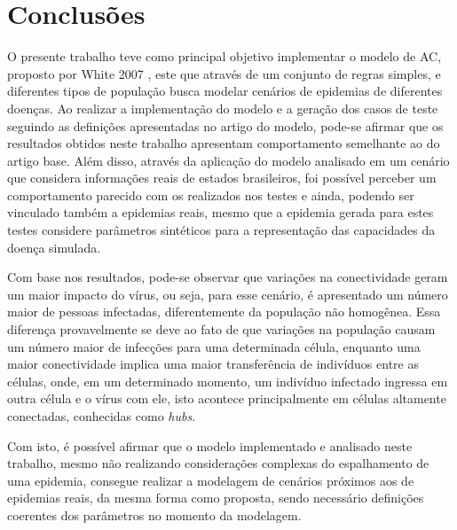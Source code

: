 \documentclass[a4paper,12pt]{article}
\begin{document}
\section{Conclusões}


O presente trabalho teve como principal objetivo implementar o modelo de AC, proposto por White 2007 \cite{White2007}, este que através de um conjunto de regras simples, e diferentes tipos de população busca modelar cenários de epidemias de diferentes doenças. Ao realizar a implementação do modelo e a geração dos casos de teste seguindo as definições apresentadas no artigo do modelo, pode-se afirmar que os resultados obtidos neste trabalho apresentam comportamento semelhante ao do artigo base. Além disso, através da aplicação do modelo analisado em um cenário que considera informações reais de estados brasileiros, foi possível perceber um comportamento parecido com os realizados nos testes e ainda, podendo ser vinculado também a epidemias reais, mesmo que a epidemia gerada para estes testes considere parâmetros sintéticos para a representação das capacidades da doença simulada.

Com base nos resultados, pode-se observar que variações na conectividade geram um maior impacto do vírus, ou seja, para esse cenário, é apresentado um número maior de pessoas infectadas, diferentemente da população não homogênea. Essa diferença provavelmente se deve ao fato de que variações na população causam um número maior de infecções para uma determinada célula, enquanto uma maior conectividade implica uma maior transferência de indivíduos entre as células, onde, em um determinado momento, um indivíduo infectado ingressa em outra célula e o vírus com ele, isto acontece principalmente em células altamente conectadas, conhecidas como \textit{hubs}.

Com isto, é possível afirmar que o modelo implementado e analisado neste trabalho, mesmo não realizando considerações complexas do espalhamento de uma epidemia, consegue realizar a modelagem de cenários próximos aos de epidemias reais, da mesma forma como proposta, sendo necessário definições coerentes dos parâmetros no momento da modelagem.

\newpage


\end{document}
